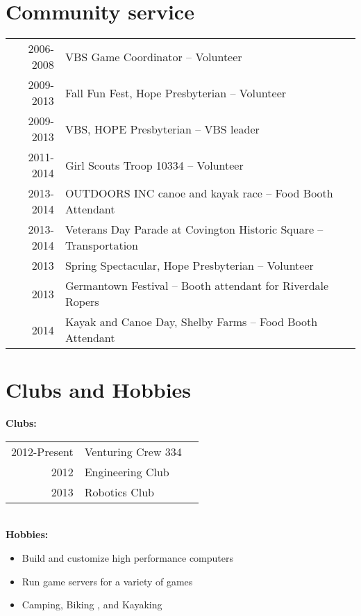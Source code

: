\documentclass[letterpaper]{deedy-resume} %
\begin{document}
\begin{minipage}[t]{0.66\textwidth}
\begin{tabular}{rll}
\end{tabular}

\sectionspace %


\section{Community service} 

\begin{tabular}{rll}
2006-2008	& VBS Game Coordinator -- Volunteer \\
2009-2013	& Fall Fun Fest, Hope Presbyterian -- Volunteer  \\ 
\newenvironment*{}[<++>][<++>]{<++>}{<++>}2009-2013 & VBS, HOPE Presbyterian -- VBS leader \\
2011-2014	 & Girl Scouts Troop 10334 -- Volunteer \\
2013-2014	 & OUTDOORS INC canoe and kayak race -- Food Booth Attendant \\
2013-2014 & Veterans Day Parade at Covington Historic Square -- Transportation \\
2013	 & Spring Spectacular, Hope Presbyterian -- Volunteer \\
2013	 & Germantown Festival -- Booth attendant for Riverdale Ropers \\
2014	 	& Kayak and Canoe Day, Shelby Farms -- Food Booth Attendant \\




\end{tabular}

\sectionspace %

 \section{Clubs and Hobbies} 
 \textbf{Clubs:} \\
 \begin{tabular}{rll}
 2012-Present &Venturing Crew  334 \\
 2012 & Engineering Club \\
 2013 &Robotics Club \\
 
 
 \end{tabular} \\
 \textbf{Hobbies:} \\
 \begin{itemize}
\item  Build and customize high performance computers 
 \item Run game servers for a variety of games 
 \item Camping, Biking , and Kayaking 
 \end{itemize}
 

\end{minipage}
\end{document}
